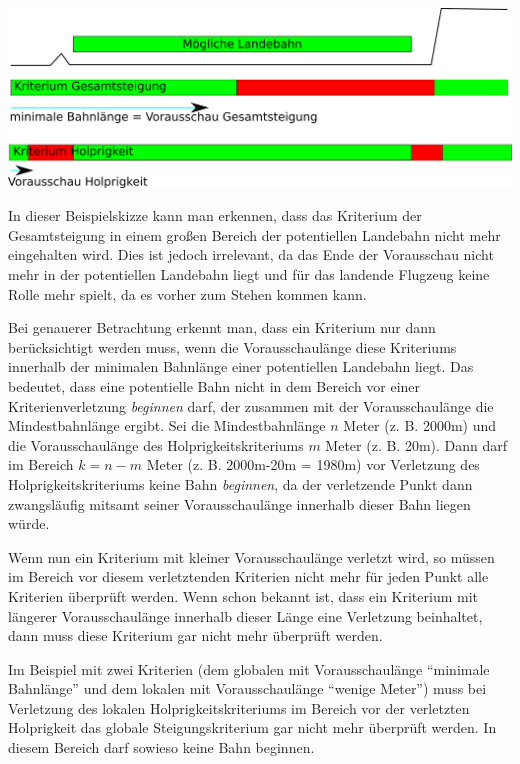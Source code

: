 \documentclass[
11pt, %
a4paper, %
oneside, %
pdfspacing, %
headinclude,
BCOR5mm, %
ngerman, %
bibtotocnumbered,
]{scrartcl}
\begin{document}
\includegraphics[width=\textwidth]{./drawings/Vorausschau.png}

In dieser Beispielskizze kann man erkennen, dass das Kriterium der Gesamtsteigung in einem großen Bereich der potentiellen Landebahn nicht mehr eingehalten wird. Dies ist jedoch irrelevant, da das Ende der Vorausschau nicht mehr in der potentiellen Landebahn liegt und für das landende Flugzeug keine Rolle mehr spielt, da es vorher zum Stehen kommen kann. 

Bei genauerer Betrachtung erkennt man, dass ein Kriterium nur dann berücksichtigt werden muss, wenn die Vorausschaulänge diese Kriteriums innerhalb der minimalen Bahnlänge einer potentiellen Landebahn liegt. Das bedeutet, dass eine potentielle Bahn nicht in dem Bereich vor einer Kriterienverletzung \emph{beginnen} darf, der zusammen mit der Vorausschaulänge die Mindestbahnlänge ergibt. Sei die Mindestbahnlänge $n$ Meter (z. B. 2000m) und die Vorausschaulänge des Holprigkeitskriteriums $m$ Meter (z. B. 20m). Dann darf im Bereich $k=n-m$ Meter (z. B. 2000m-20m = 1980m) vor Verletzung des Holprigkeitskriteriums keine Bahn \emph{beginnen}, da der verletzende Punkt dann zwangsläufig mitsamt seiner Vorausschaulänge innerhalb dieser Bahn liegen würde.

\skippingparagraph
Wenn nun ein Kriterium mit kleiner Vorausschaulänge verletzt wird, so müssen im Bereich vor diesem verletztenden Kriterien nicht mehr für jeden Punkt alle Kriterien überprüft werden. Wenn schon bekannt ist, dass ein Kriterium mit längerer Vorausschaulänge innerhalb dieser Länge eine Verletzung beinhaltet, dann muss diese Kriterium gar nicht mehr überprüft werden.

Im Beispiel mit zwei Kriterien (dem globalen mit Vorausschaulänge "`minimale Bahnlänge"' und dem lokalen mit Vorausschaulänge "`wenige Meter"') muss bei Verletzung des lokalen Holprigkeitskriteriums im Bereich vor der verletzten Holprigkeit das globale Steigungskriterium gar nicht mehr überprüft werden. In diesem Bereich darf sowieso keine Bahn beginnen.
\end{document}
